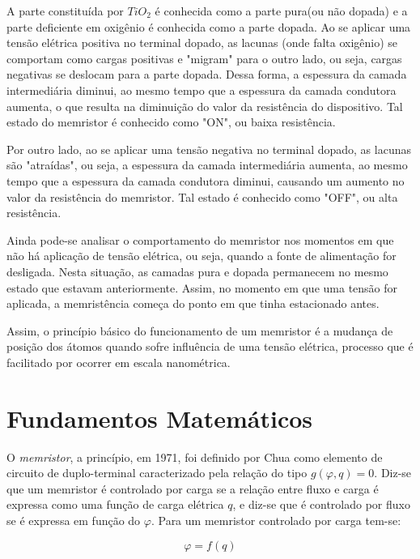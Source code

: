 \documentclass{ceel}
\begin{document}
\begin{multicols}{2}
A parte constituída por $TiO_2$ é conhecida como a parte pura(ou não dopada) e a parte deficiente em oxigênio é conhecida como a parte dopada. Ao se aplicar uma tensão elétrica positiva no terminal dopado, as lacunas (onde falta oxigênio) se comportam como cargas positivas e "migram" para o outro lado, ou seja, cargas negativas se deslocam para a parte dopada. Dessa forma, a espessura da camada intermediária diminui, ao mesmo tempo que a espessura da camada condutora aumenta, o que resulta na diminuição do valor da resistência do dispositivo. Tal estado do memristor é conhecido como "ON", ou baixa resistência. %

Por outro lado, ao se aplicar uma tensão negativa no terminal dopado, as lacunas são "atraídas", ou seja, a espessura da camada intermediária aumenta, ao mesmo tempo que a espessura da camada condutora diminui, causando um aumento no valor da resistência do memristor. Tal estado é conhecido como "OFF", ou alta resistência. 

Ainda pode-se analisar o comportamento do memristor nos momentos em que não há aplicação de tensão elétrica, ou seja, quando a fonte de alimentação for desligada. Nesta situação, as camadas pura e dopada permanecem no mesmo estado que estavam anteriormente. Assim, no momento em que uma tensão for aplicada, a memristência começa do ponto em que tinha estacionado antes. %

Assim, o princípio básico do funcionamento de um memristor é a mudança de posição dos átomos quando sofre influência de uma tensão elétrica, processo que é facilitado por ocorrer em escala nanométrica. %

\section{Fundamentos Matemáticos}\label{analise-matematica}
O \emph{memristor}, a princípio, em 1971, foi definido por Chua \cite{artigo} como elemento de circuito de duplo-terminal caracterizado pela relação do tipo $g(\varphi, q)=0$. Diz-se que um memristor é controlado por carga se a relação entre fluxo e carga é expressa como uma função de carga elétrica $q$, e diz-se que é controlado por fluxo se é expressa em função do $\varphi$. Para um memristor controlado por carga tem-se:

\begin{equation}\label{mem-charge}
\varphi = f(q)
\end{equation}


\end{multicols}
\end{document}

